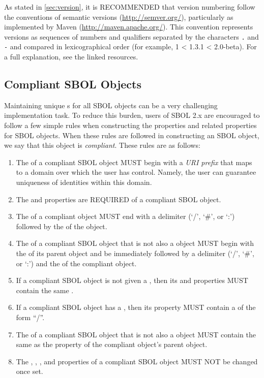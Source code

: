 As stated in \ref{sec:version},  it is RECOMMENDED that version numbering follow
the conventions of semantic versions (\url{http://semver.org/}), particularly as implemented by Maven (\url{http://maven.apache.org/}).
This convention represents versions as sequences of numbers and qualifiers separated by the characters {\tt .} and {\tt -} and compared in lexicographical order (for example, 1 < 1.3.1 < 2.0-beta).  For a full explanation, see the linked resources.

\subsection{Compliant SBOL Objects}
\label{sec:compliant}

Maintaining unique  s for all SBOL objects can be a very challenging implementation task.  To reduce this burden, users of SBOL 2.x are encouraged to follow a few simple rules when constructing the  properties and related properties for SBOL objects.  When these rules are followed in constructing an SBOL object, we say that this object is \emph{compliant}. These rules are as follows:
\begin{enumerate}
\item The  of a compliant SBOL object MUST begin with a \emph{URI prefix} that maps to a domain over which the user has control. Namely, the user can guarantee uniqueness of identities within this domain.
\item The  and  properties are REQUIRED of a compliant SBOL object.
\item The  of a compliant  object MUST end with a delimiter (`/', `\#', or `:') followed by the  of the object. 
\item The  of a compliant SBOL object that is not also a  object MUST begin with the  of its parent object and be immediately followed by a delimiter (`/', `\#', or `:') and the  of the compliant object.
\item If a compliant SBOL object is not given a , then its  and  properties MUST contain the same .
\item If a compliant SBOL object has a , then its  property MUST contain a  of the form  ``/''.
\item The  of a compliant SBOL object that is not also a  object MUST contain the same  as the  property of the compliant object's parent object.
\item The , , , and  properties of a compliant SBOL object MUST NOT be changed once set.
\end{enumerate}


